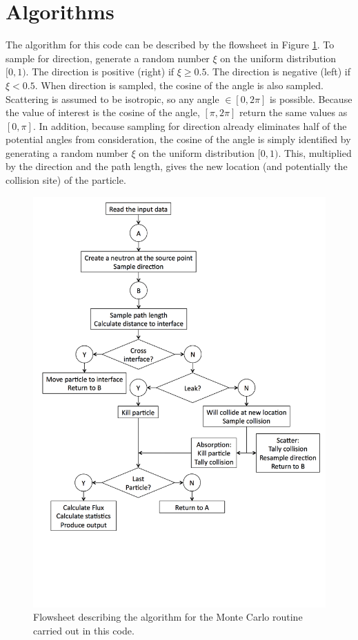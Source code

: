 \documentclass[11pt, oneside]{article}   	%
\begin{document}
\section{Algorithms}

The algorithm for this code can be described by the flowsheet in Figure \ref{fig:flowsheet}. To sample for direction, generate a random number $\xi$ on the uniform distribution $[0,1)$. The direction is positive (right) if $\xi \geq 0.5$. The direction is negative (left) if $\xi < 0.5$. When direction is sampled, the cosine of the angle is also sampled. Scattering is assumed to be isotropic, so any angle $\in [0, 2\pi]$ is possible. Because the value of interest is the cosine of the angle, $[\pi, 2\pi]$ return the same values as $[0, \pi]$. In addition, because sampling for direction already eliminates half of the potential angles from consideration, the cosine of the angle is simply identified by generating a random number $\xi$ on the uniform distribution $[0, 1)$. This, multiplied by the direction and the path length, gives the new location (and potentially the collision site) of the particle.

\begin{figure}
  \includegraphics[width=\linewidth]{flowsheet}
  \caption{Flowsheet describing the algorithm for the Monte Carlo routine carried out in this code.}
  \label{fig:flowsheet}
\end{figure}
\end{document}
